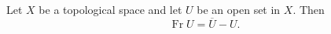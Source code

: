 Let $X$ be a topological space and let $U$ be an open set in $X$. Then
$$\operatorname{Fr} U = \overline{U} - U.$$
